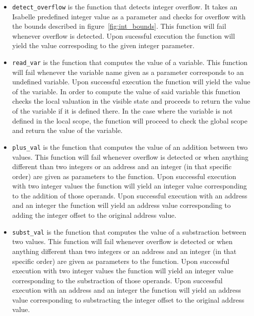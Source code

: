 \begin{itemize}
  \item{\verb|detect_overflow| is the function that detects integer overflow.
  It takes an Isabelle predefined integer value as a parameter and checks for overflow with the bounds described in figure~\ref{fig:int_bounds}.
  This function will fail whenever overflow is detected.
  Upon sucessful execution the function will yield the value correspoding to the given integer parameter.}
  \item{\verb|read_var| is the function that computes the value of a variable.
  This function will fail whenever the variable name given as a parameter corresponds to an undefined variable.
  Upon successful execution the function will yield the value of the variable.
  In order to compute the value of said variable this function checks the local valuation in the visible state and proceeds to return the value of the variable if it is defined there.
  In the case where the variable is not defined in the local scope, the function will proceed to check the global scope and return the value of the variable.}
  \item{\verb|plus_val| is the function that computes the value of an addition between two values.
  This function will fail whenever overflow is detected or when anything different than two integers or an address and an integer (in that specific order) are given as parameters to the function.
  Upon successful execution with two integer values the function will yield an integer value corresponding to the addition of those operands.
  Upon successful execution with an address and an integer the function will yield an address value corresponding to adding the integer offset to the original address value.}
  \item{\verb|subst_val| is the function that computes the value of a substraction between two values.
  This function will fail whenever overflow is detected or when anything different than two integers or an address and an integer (in that specific order) are given as parameters to the function.
  Upon successful execution with two integer values the function will yield an integer value corresponding to the substraction of those operands.
  Upon successful execution with an address and an integer the function will yield an address value corresponding to substracting the integer offset to the original address value.}
\end{itemize}









